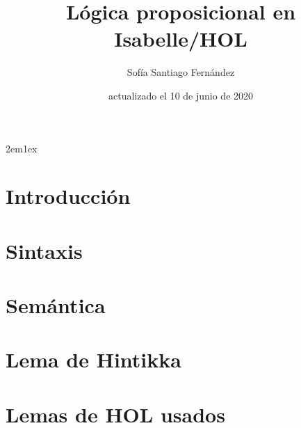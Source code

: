 \documentclass[12pt,a4paper,fleqn]{book}
\begin{document}
\title{Lógica proposicional en Isabelle/HOL}
\author{Sofía Santiago Fernández}
\date{actualizado el 10 de junio de 2020}
\maketitle


\tableofcontents

\parindent 2em\parskip 1ex

% 

\chapter{Introducción}


\chapter{Sintaxis}


\chapter{Semántica}


\chapter{Lema de Hintikka}


\appendix
\chapter{Lemas de HOL usados}


\nocite{fitting1996first,LMF,CC,articulo,escribir,tutorial,main,isar,implementation,datatypes}



\todototoc
\listoftodos
\end{document}
